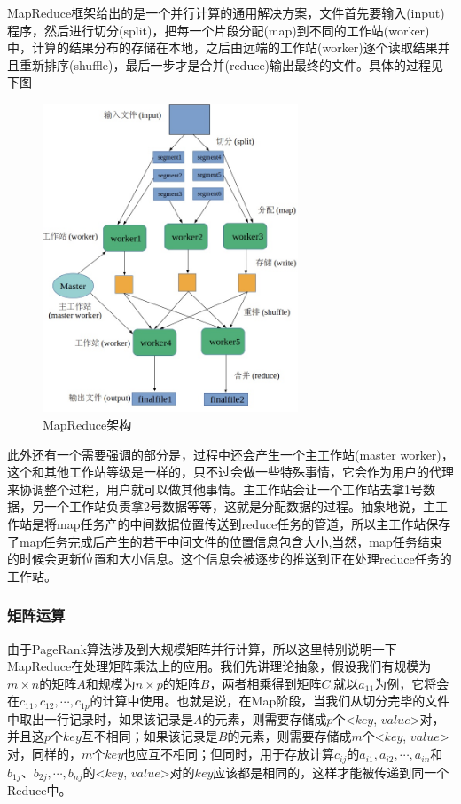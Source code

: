 \documentclass[a4paper, 14pt, twocolumn]{article}
\theoremstyle{definition}
\begin{document}
MapReduce框架给出的是一个并行计算的通用解决方案，文件首先要输入(input)程序，然后进行切分(split)，把每一个片段分配(map)到不同的工作站(worker)中，计算的结果分布的存储在本地，之后由远端的工作站(worker)逐个读取结果并且重新排序(shuffle)，最后一步才是合并(reduce)输出最终的文件。具体的过程见下图
\begin{figure}[H]
\centering
\includegraphics[width=3in]{figure/MapReduce.jpg}
\caption{MapReduce架构}
\end{figure}
此外还有一个需要强调的部分是，过程中还会产生一个主工作站(master worker)，这个和其他工作站等级是一样的，只不过会做一些特殊事情，它会作为用户的代理来协调整个过程，用户就可以做其他事情。主工作站会让一个工作站去拿1号数据，另一个工作站负责拿2号数据等等，这就是分配数据的过程。抽象地说，主工作站是将map任务产的中间数据位置传送到reduce任务的管道，所以主工作站保存了map任务完成后产生的若干中间文件的位置信息包含大小,当然，map任务结束的时候会更新位置和大小信息。这个信息会被逐步的推送到正在处理reduce任务的工作站。
\subsubsection{矩阵运算}
由于PageRank算法涉及到大规模矩阵并行计算，所以这里特别说明一下MapReduce在处理矩阵乘法上的应用。我们先讲理论抽象，假设我们有规模为$m \times n$的矩阵$A$和规模为$n \times p$的矩阵$B$，两者相乘得到矩阵$C$.就以$a_{11}$为例，它将会在$c_{11},c_{12},\cdots,c_{1p}$的计算中使用。也就是说，在Map阶段，当我们从切分完毕的文件中取出一行记录时，如果该记录是$A$的元素，则需要存储成$p$个<$key$, $value$>对，并且这$p$个$key$互不相同；如果该记录是$B$的元素，则需要存储成$m$个<$key$, $value$>对，同样的，$m$个$key$也应互不相同；但同时，用于存放计算$c_{ij}$的$a_{i1},a_{i2},\cdots,a_{in}$和$b_{1j}、b_{2j},\cdots, b_{nj}$的<$key$, $value$>对的$key$应该都是相同的，这样才能被传递到同一个Reduce中。
\end{document}
